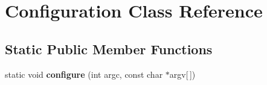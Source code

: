 \hypertarget{class_configuration}{}\section{Configuration Class Reference}
\label{class_configuration}
\subsection*{Static Public Member Functions}
\begin{DoxyCompactItemize}
\item 
\hypertarget{class_configuration_a7588a603cb1f63ecd953f9e811df1503}{}static void {\bfseries configure} (int argc, const char $\ast$argv\mbox{[}$\,$\mbox{]})\label{class_configuration_a7588a603cb1f63ecd953f9e811df1503}

\end{DoxyCompactItemize}
